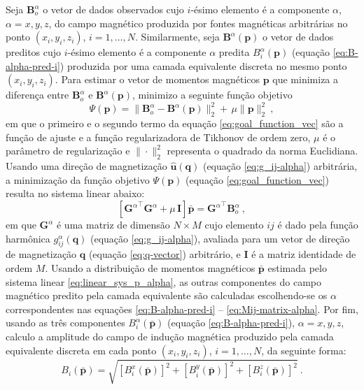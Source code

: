 Seja $\mathbf{B}^{\alpha}_{o}$ o vetor de dados observados cujo $i$-ésimo elemento é a componente 
$\alpha$, $\alpha = x, y, z$, do campo magnético produzida por fontes magnéticas arbitrárias no ponto 
$(x_{i},y_{i},z_{i})$, $i = 1, \dots, N$. Similarmente, seja $\mathbf{B}^{\alpha}(\mathbf{p})$ 
o vetor de dados preditos cujo $i$-ésimo elemento é a componente $\alpha$ predita 
$B^{\alpha}_{i} (\mathbf{p})$ (equação \ref{eq:B-alpha-pred-i}) produzida por uma camada equivalente 
discreta no mesmo ponto $(x_{i},y_{i},z_{i})$. 
Para estimar o vetor de momentos magnéticos $\mathbf{p}$ que minimiza a diferença entre 
$\mathbf{B}^{\alpha}_{o}$ e $\mathbf{B}^{\alpha}(\mathbf{p})$, minimizo a seguinte função 
objetivo
\begin{equation}
\Psi(\mathbf{p}) =\lVert \mathbf{B}^{\alpha}_{o} - \mathbf{B}^{\alpha}(\mathbf{p}) 
\rVert_{2}^{2} + \, \mu  \parallel \mathbf{p} \parallel_{2}^{2} \: ,
\label{eq:goal_function_vec}
\end{equation}
em que o primeiro e o segundo termo da equação \ref{eq:goal_function_vec} são a função de ajuste e a 
função regularizadora de Tikhonov de ordem zero, $\mu$ é o parâmetro de regularização e 
$\| \cdot \|_{2}^{2}$ representa o quadrado da norma Euclidiana. 
Usando uma direção de magnetização $\hat{\mathbf{u}}(\mathbf{q})$ (equação \ref{eq:g_ij-alpha}) arbitrária,
a minimização da função objetivo $\Psi(\mathbf{p})$ (equação \ref{eq:goal_function_vec}) resulta no 
sistema linear abaixo:
\begin{equation}
\left[ {\mathbf{G}^{\alpha}}^{\top} \mathbf{G}^{\alpha} + \mu \, \mathbf{I} \right] 
\bar{\mathbf{p}} = {\mathbf{G}^{\alpha}}^{\top} \mathbf{B}^{\alpha}_{o} \: ,
\label{eq:linear_sys_p_alpha}
\end{equation}
em que $\mathbf{G}^{\alpha}$ é uma matriz de dimensão $N \times M$ cujo elemento $ij$ é dado pela função 
harmônica $g_{ij}^{\alpha}(\mathbf{q})$ (equação \ref{eq:g_ij-alpha}), avaliada para um vetor de direção 
de magnetização $\mathbf{q}$ (equação \ref{eq:q-vector}) arbitrário, e $\mathbf{I}$ é a matriz identidade 
de ordem $M$. Usando a distribuição de momentos magnéticos $\bar{\mathbf{p}}$ estimada pelo 
sistema linear \ref{eq:linear_sys_p_alpha}, as outras componentes do campo magnético predito pela 
camada equivalente são calculadas escolhendo-se os $\alpha$ correspondentes nas equações 
\ref{eq:B-alpha-pred-i} -- \ref{eq:Mij-matrix-alpha}. 
Por fim, usando as três componentes $B^{\alpha}_{i}(\bar{\mathbf{p}})$
(equação \ref{eq:B-alpha-pred-i}), $\alpha = x, y, z$, calculo a amplitude do campo de indução 
magnética produzido pela camada equivalente discreta em cada ponto $ (x_{i}, y_{i}, z_{i}) $, 
$i = 1, \dots, N$, da seguinte forma:
\begin{equation}
B_{i}(\bar{\mathbf{p}}) = \sqrt{[B^{x}_{i}(\bar{\mathbf{p}})]^{2} + 
[B^{y}_{i}(\bar{\mathbf{p}})]^{2} + [B^{z}_{i}(\bar{\mathbf{p}})]^{2}} \: .
\label{eq:amplitude_field}
\end{equation}

